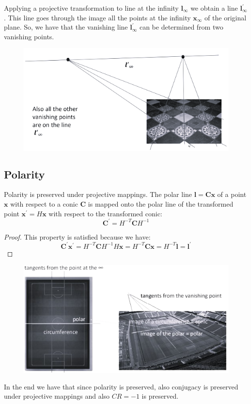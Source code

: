\documentclass[12pt, a4paper]{report}
\begin{document}
    Applying a projective transformation to line at the infinity $\boldsymbol{l}_{\infty}$ we obtain a line $\boldsymbol{l}_{\infty}^{'}$. This line goes through the image all the points at 
    the infinity $\boldsymbol{x}_{\infty}$ of the original plane. So, we have that the vanishing line $\boldsymbol{l}_{\infty}^{'}$ can be determined from two vanishing points. 
    \begin{figure}[H]
        \centering
        \includegraphics[width=0.75\linewidth]{images/vanishingline.png}
    \end{figure}

    \subsection{Polarity}
    Polarity is preserved under projective mappings. The polar line $\boldsymbol{l}=\boldsymbol{Cx}$ of a point $\boldsymbol{x}$ with respect to a conic $\boldsymbol{C}$ is mapped onto the polar line 
    of the transformed point $\boldsymbol{x}^{'}=H\boldsymbol{x}$ with respect to the transformed conic: 
    \[\boldsymbol{C}^{'}=H^{-T}\boldsymbol{C}H^{-1}\]
    \begin{proof}
        This property is satisfied because we have: 
        \[\boldsymbol{C}^{'}\boldsymbol{x}^{'}=H^{-T}\boldsymbol{C}H^{-1}H\boldsymbol{x}=H^{-T}\boldsymbol{Cx}=H^{-T}\boldsymbol{l}=\boldsymbol{l}^{'}\]
    \end{proof}
    \begin{figure}[H]
        \centering
        \includegraphics[width=0.75\linewidth]{images/polarity.png}
    \end{figure}
    In the end we have that since polarity is preserved, also conjugacy is preserved under projective mappings and also $CR=-1$ is preserved.
\end{document}
